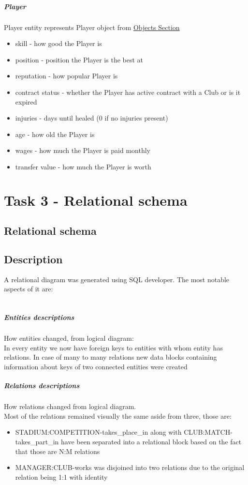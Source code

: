 \documentclass{report}
\begin{document}
\paragraph{Player}
Player entity represents Player object from \hyperref[Objects Section]{Objects Section}
\begin{itemize}
    \item skill - how good the Player is
    \item position - position the Player is the best at
    \item reputation - how popular Player is
    \item contract status - whether the Player has active contract with a Club or is it expired
    \item injuries - days until healed (0 if no injuries present)
    \item age - how old the Player is
    \item wages - how much the Player is paid monthly
    \item transfer value - how much the Player is worth
\end{itemize}

\chapter{Task 3 - Relational schema}
\section{Relational schema}

\section{Description}
A relational diagram was generated using SQL developer. The most notable aspects of it are:\\
\\
\paragraph{Entities descriptions}
How entities changed, from logical diagram:\\
In every entity we now have foreign keys to entities with whom entity has relations. In case of many to many relations new data blocks containing information about keys of two connected entities were created 
\paragraph{Relations descriptions}
How relations changed from logical diagram. \\ 
Most of the relations remained visually the same aside from three, those are:
\begin{itemize}
\item STADIUM:COMPETITION-takes\_place\_in along with CLUB:MATCH-takes\_part\_in have been separated into a relational block based on the fact that those are N:M relations
\item MANAGER:CLUB-works was disjoined into two relations due to the original relation being 1:1 with identity
\end{itemize}
\end{document}
